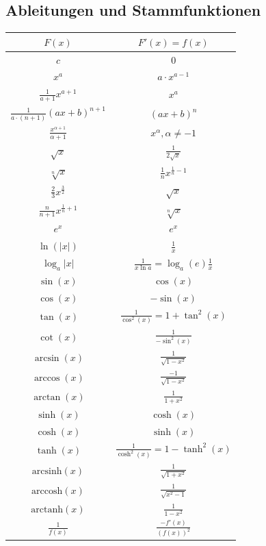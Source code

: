 \documentclass[a4paper,8pt]{extarticle}
\renewcommand*{\arraystretch}{2}
\begin{document}
\subsection{Ableitungen und Stammfunktionen}

\renewcommand\arraystretch{2}

\begin{center}
        \begin{tabular}{c||c}
                $F(x)$ & $F'(x) = f(x)$ \\
                \hline \hline
                
                $ c $ & $ 0 $ \\
	        $ x^a $ & $ a \cdot x^{a - 1} $ \\
                $ \frac{1}{a+1} x^{a+1} $ & $ x^a $ \\
                $ \frac{1}{a\cdot(n+1)} (ax+b)^{n+1} $ & $ (ax+b)^n $ \\
	        $ \frac{x^{\alpha+1}}{\alpha + 1} $ & $ x^\alpha, \alpha \neq -1 $ \\
                $ \sqrt x $ & $ \frac{1}{2 \sqrt x} $ \\
                $ \sqrt[n] x $ & $ \frac{1}{n} {x}^{ \frac{1}{n} -1 } $ \\
                $ \frac{2}{3} x^{ \frac{3}{2} } $ & $ \sqrt x $ \\
                $ \frac{n}{n+1} x^{ \frac{1}{n}+1 } $ & $ \sqrt[n] x $ \\
	        $ e^x $ & $ e^x $ \\
	        $ \ln(|x|) $ & $ \frac{1}{x} $ \\
                $ \log_a |x| $  &  $ \frac{1}{x \ln a} = \log_a(e) \frac{1}{x} $ \\
	        $ \sin(x) $ & $ \cos(x) $ \\
	        $ \cos(x) $ & $ -\sin(x) $ \\
	        $ \tan(x) $ & $ \frac{1}{\cos^2(x)} = 1 + \tan^2(x) $ \\
	        $ \cot(x) $ & $ \frac{1}{-\sin^2(x)} $ \\
	        $ \arcsin(x) $ & $ \frac{1}{\sqrt{1 - x^2}} $ \\
	        $ \arccos(x) $ & $ \frac{-1}{\sqrt{1 - x^2}} $ \\
	        $ \arctan(x) $ & $ \frac{1}{1 + x^2} $ \\
	        $ \sinh(x) $ & $ \cosh(x) $ \\
	        $ \cosh(x) $ & $ \sinh(x) $ \\
          $ \tanh(x) $ & $ \frac{1}{\cosh^2(x)} = 1 - \tanh^2(x) $ \\
          $ \text{arcsinh}(x) $ & $ \frac{1}{\sqrt{1 + x^2}} $ \\
          $ \text{arccosh}(x) $ & $ \frac{1}{\sqrt{x^2 - 1}} $ \\
          $ \text{arctanh}(x) $ & $ \frac{1}{1 - x^2} $ \\
          $ \frac{1}{f(x)} $ & $ \frac{-f'(x)}{(f(x))^2} $ \\
        \end{tabular}
\end{center}
\end{document}
